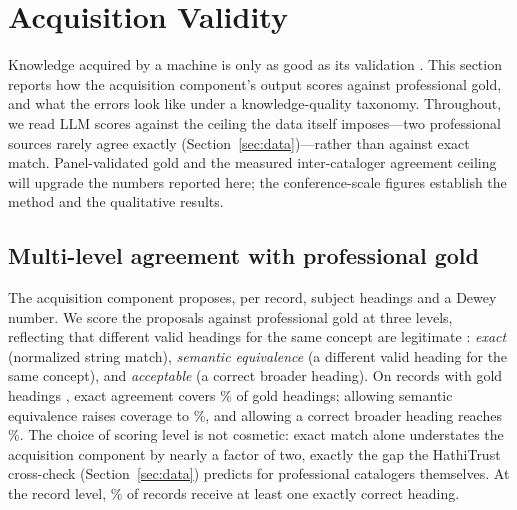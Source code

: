 
\section{Acquisition Validity}
\label{sec:valid}

Knowledge acquired by a machine is only as good as its validation
\cite{okeefe_kbs_validation}. This section reports how the acquisition
component's output scores against professional gold, and what the errors
look like under a knowledge-quality taxonomy. Throughout, we read LLM
scores against the ceiling the data itself imposes---two professional
sources rarely agree exactly (Section~\ref{sec:data})---rather than against
exact match. Panel-validated gold and the measured inter-cataloger
agreement ceiling  will upgrade the numbers reported here; the
conference-scale figures establish the method and the qualitative results.

\subsection{Multi-level agreement with professional gold}

The acquisition component proposes, per record, subject headings and a
Dewey number. We score the proposals against professional gold at three
levels, reflecting that different valid headings for the same concept are
legitimate \cite{okeefe_kbs_validation}: \emph{exact} (normalized string
match), \emph{semantic equivalence} (a different valid heading for the same
concept), and \emph{acceptable} (a correct broader heading). On
\CatRecords{} records with \CatGoldHeadings{} gold headings
, exact agreement covers \CatExact\% of gold headings;
allowing semantic equivalence raises coverage to \CatSemantic\%, and
allowing a correct broader heading reaches \CatAcceptable\%. The choice of
scoring level is not cosmetic: exact match alone understates the
acquisition component by nearly a factor of two, exactly the gap the
HathiTrust cross-check (Section~\ref{sec:data}) predicts for professional
catalogers themselves. At the record level, \CatRecordsAnyExact\% of
records receive at least one exactly correct heading.

